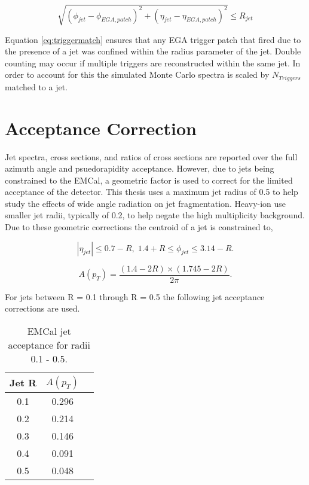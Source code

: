 \begin{equation}
\sqrt{ ( \phi_{jet} - \phi_{EGA, patch} )^{2} + ( \eta_{jet} - \eta_{EGA, patch} )^{2}}  \leq R_{jet} 
\label{eq:triggermatch}
\end{equation}

\noindent
Equation \ref{eq:triggermatch} ensures that any EGA trigger patch that fired due to the presence of a jet was confined within the radius parameter of the jet.  Double counting may occur if multiple triggers are reconstructed within the same jet.  In order to account for this the simulated Monte Carlo spectra is scaled by $N_{Triggers}$ matched to a jet.

\section{Acceptance Correction}
Jet spectra, cross sections, and ratios of cross sections are reported over the full azimuth angle and psuedorapidity acceptance.  However, due to jets being constrained to the EMCal, a geometric factor is used to correct for the limited acceptance of the detector.  This thesis uses a maximum jet radius of 0.5 to help study the effects of wide angle radiation on jet fragmentation.  Heavy-ion use smaller jet radii, typically of 0.2, to help negate the high multiplicity background.  Due to these geometric corrections the centroid of a jet is constrained to,

\begin{equation}
|\eta_{jet}| \leq 0.7 - R, \; 1.4 + R \leq \phi_{jet} \leq 3.14 -R.
\label{eq:jetconstration}
\end{equation}

\begin{equation}
A(p_{T}) = \frac{(1.4 - 2R) \times (1.745 - 2R)}{2 \pi}.
\label{eq:acceptance}
\end{equation}

For jets between R = 0.1 through R = 0.5 the following jet acceptance corrections are used.

\begin{table}[hb]
\label{tab:AcceptanceFactor}
\begin{center}
\begin{tabular}[b]{|c|c|c|}
	\hline
	Jet R & $A(p_{T})$ \\ \hline
	0.1 & 0.296 \\ \hline
	0.2 & 0.214\\ \hline
	0.3 & 0.146\\ \hline
	0.4 & 0.091\\ \hline
	0.5 & 0.048\\ \hline
\end{tabular}
\end{center}
\caption{EMCal jet acceptance for radii 0.1 - 0.5.}
\end{table}








